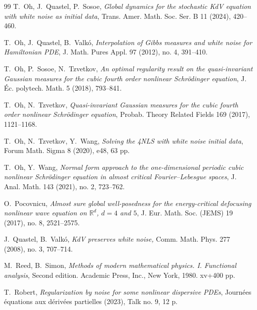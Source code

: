 \documentclass[letterpaper, 11pt,  reqno]{amsart}
\newcommand{\1}{\hspace{0.5mm}\text{I}\hspace{0.5mm}}
\newcommand{\R}{\mathbb{R}}
\numberwithin{equation}{section}
\numberwithin{theorem}{section}
\begin{document}
\begin{thebibliography}{99}
T.~Oh, J.~Quastel, P.~Sosoe,
{\it Global dynamics for the stochastic KdV equation with white noise as initial data},
Trans. Amer. Math. Soc. Ser. B 11 (2024), 420--460.



T.~Oh, J.~Quastel, B.~Valk\'o,
{\it  Interpolation of Gibbs measures and white noise for Hamiltonian PDE},
J. Math. Pures Appl. 97 (2012), no. 4, 391--410. 


T.~Oh, P.~Sosoe, N.~Tzvetkov,
{\it  An optimal regularity result on the quasi-invariant Gaussian measures for the cubic fourth order nonlinear Schr\"odinger equation},  
J. \'Ec. polytech. Math. 5 (2018), 793--841. 




T.~Oh,  N.~Tzvetkov,
{\it  Quasi-invariant Gaussian measures for the cubic fourth order nonlinear Schr\"odinger equation}, 
 Probab. Theory Related Fields 169 (2017), 1121--1168. 


T.~Oh, N.~Tzvetkov, Y.~Wang,
{\it  Solving the 4NLS with white noise initial data}, Forum Math. Sigma 8 (2020), e48, 63 pp. 


T.~Oh, Y.~Wang,
{\it  Normal form approach to the one-dimensional periodic cubic nonlinear Schr\"odinger equation in almost critical Fourier--Lebesgue spaces}, 
J. Anal. Math. 143 (2021), no. 2, 723--762. 
%
%
%
%

O.~Pocovnicu, 
{\it Almost sure global well-posedness for the energy-critical defocusing nonlinear wave equation on $\R^d$,
 $d = 4$ and $5$}, J. Eur. Math. Soc. (JEMS) 19 (2017), no. 8, 2521--2575.


J.~Quastel, B.~Valk\'o, 
{\it KdV preserves white noise,} Comm. Math. Phys. 277 (2008), no. 3, 707--714.



M.~Reed, B.~Simon, 
{\it  Methods of modern mathematical physics. I. Functional analysis}, 
Second edition. Academic Press, Inc., New York, 1980. xv+400 pp.




T.~Robert, 
{\it Regularization by noise for some nonlinear dispersive PDEs},
 Journ\'ees \'equations aux d\'eriv\'ees partielles (2023), Talk no. 9, 12 p. 






\end{thebibliography}
\end{document}

